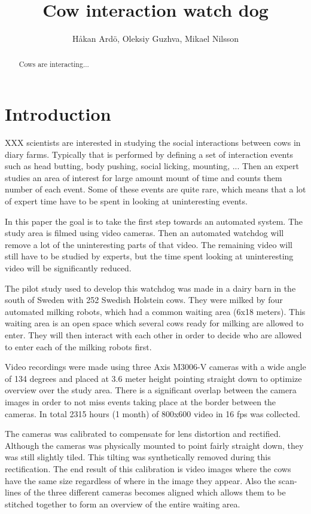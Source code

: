 \documentclass[10pt,a4paper,twocolumn]{article}
\author{Håkan Ardö, Oleksiy Guzhva, Mikael Nilsson}
\title{Cow interaction watch dog}
\begin{document}
\maketitle

\begin{abstract}
Cows are interacting...
\end{abstract}

\section{Introduction}

XXX scientists are interested in studying the social interactions between cows in diary farms. Typically that is performed by defining a set of interaction events such as head butting, body pushing, social licking, mounting, ... Then an expert studies an area of interest for large amount mount of time and counts them number of each event. Some of these events are quite rare, which means that a lot of expert time have to be spent in looking at uninteresting events.

In this paper the goal is to take the first step towards an automated system. The study area is filmed using video cameras. Then an automated watchdog will remove a lot of the uninteresting parts of that video. The remaining video will still have to be studied by experts, but the time spent looking at uninteresting video will be significantly reduced.

The pilot study used to develop this watchdog was made in a dairy barn in the south of Sweden with 252 Swedish Holstein cows. They were milked by four automated milking robots, which had a common waiting area (6x18 meters). This waiting area is an open space which several cows ready for milking are allowed to enter. They will then interact with each other in order to decide who are allowed to enter each of the milking robots first.

Video recordings were made using three Axis M3006-V cameras with a wide angle of 134 degrees and placed at 3.6 meter height pointing straight down to optimize overview over the study area. There is a significant overlap between the camera images in order to not miss events taking place at the border between the cameras. In total 2315 hours (1 month) of 800x600 video in 16 fps was collected.

The cameras was calibrated to compensate for lens distortion and rectified. Although the cameras was physically mounted to point fairly straight down, they was still slightly tiled. This tilting was synthetically removed during this rectification. The end result of this calibration is video images where the cows have the same size regardless of where in the image they appear. Also the scan-lines of the three different cameras becomes aligned which allows them to be stitched together to form an overview of the entire waiting area.
\end{document}
